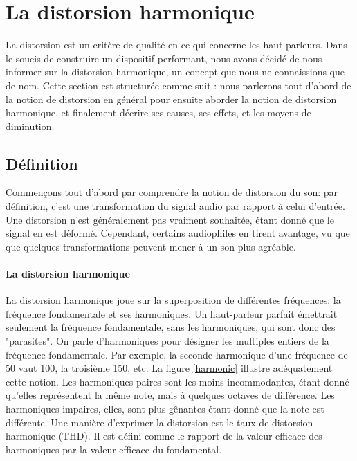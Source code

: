 

\section{La distorsion harmonique}
La distorsion est un critère de qualité en ce qui concerne les haut-parleurs.
Dans le soucis de construire un dispositif performant, nous avons décidé de 
nous informer sur la distorsion harmonique, un concept que nous ne connaissions
que de nom.
Cette section est structurée comme suit : nous parlerons tout d'abord de la notion  de distorsion 
en général pour ensuite aborder la notion  de distorsion 
harmonique, et finalement décrire ses causes, ses effets,
et les moyens de diminution.

\subsection{Définition}
Commençons tout d'abord par comprendre la notion de distorsion du son: par définition, c'est
une transformation du signal audio par rapport à celui d'entrée. Une distorsion n'est généralement pas vraiment souhaitée, étant donné
que le signal en est déformé\cite{dico}. Cependant, certains audiophiles en tirent avantage, vu que que quelques
transformations peuvent mener à un son plus agréable\cite{encyclopedie}.

\paragraph{La distorsion harmonique}
La distorsion harmonique joue sur la superposition de différentes fréquences:
la fréquence fondamentale et ses harmoniques. Un haut-parleur parfait émettrait seulement la fréquence fondamentale, sans les harmoniques, qui sont donc des "parasites".
On parle d'harmoniques pour désigner les multiples entiers de la fréquence fondamentale\cite{encyclopedia}.
Par exemple, la seconde harmonique d'une fréquence de \unit{50}{\hertz} vaut \unit{100}{\hertz}, la troisième \unit{150}{\hertz}, etc. La figure 
\ref{harmonic} illustre adéquatement cette notion.
Les harmoniques paires sont les moins incommodantes, étant donné qu'elles représentent la même note, mais à quelques octaves de différence.
Les harmoniques impaires, elles, sont plus gênantes étant donné que la note est différente\cite{hartmann}.
Une manière d'exprimer la distorsion est le taux de distorsion harmonique (THD). 
Il est défini comme le rapport de la valeur efficace des harmoniques par la valeur efficace du fondamental\cite{THD}.


